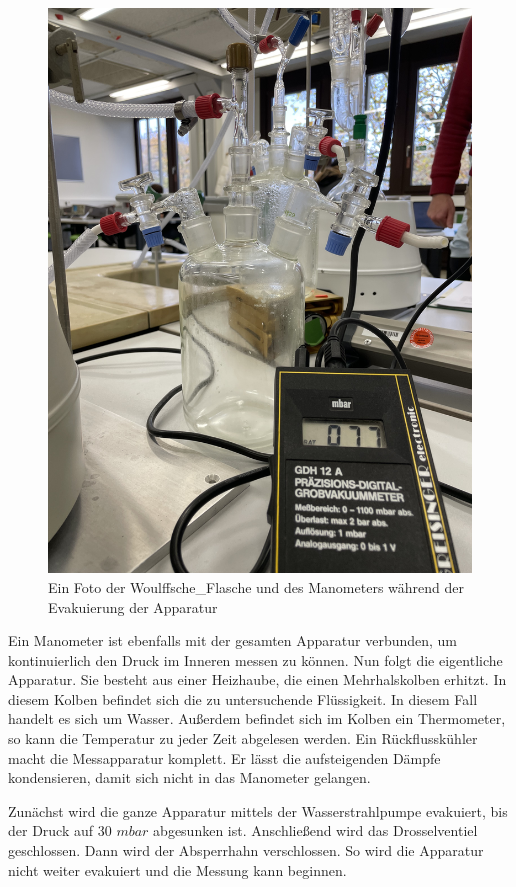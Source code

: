 \begin{figure}
    \centering
    \includegraphics[]{"Woulffsche_Flasche"}
    \caption{Ein Foto der Woulffsche_Flasche und des Manometers während der Evakuierung der Apparatur}
    \label{Abb:Woulffsche_Flasche}
\end{figure}
Ein Manometer ist ebenfalls mit der gesamten Apparatur verbunden, um kontinuierlich den Druck im Inneren messen zu können.
Nun folgt die eigentliche Apparatur.
Sie besteht aus einer Heizhaube, die einen Mehrhalskolben erhitzt.
In diesem Kolben befindet sich die zu untersuchende Flüssigkeit.
In diesem Fall handelt es sich um Wasser.
Außerdem befindet sich im Kolben ein Thermometer, so kann die Temperatur zu jeder Zeit abgelesen werden.
Ein Rückflusskühler macht die Messapparatur komplett.
Er lässt die aufsteigenden Dämpfe kondensieren, damit sich nicht in das Manometer gelangen.

Zunächst wird die ganze Apparatur mittels der Wasserstrahlpumpe evakuiert, bis der Druck auf 30 $mbar$ abgesunken ist.
Anschließend wird das Drosselventiel geschlossen.
Dann wird der Absperrhahn verschlossen.
So wird die Apparatur nicht weiter evakuiert und die Messung kann beginnen.

